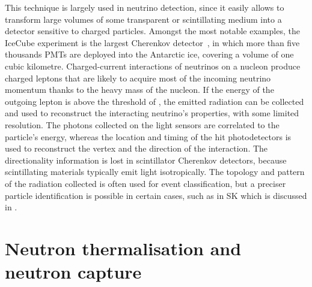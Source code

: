 This technique is largely used in neutrino detection, since it easily allows %
to transform large volumes of some transparent or scintillating medium into a detector sensitive to charged particles.
Amongst the most notable examples, the IceCube experiment is the largest Cherenkov detector~\cite{Abbasi:2008aa}, %
in which more than five thousands PMTs are deployed into the Antarctic ice, covering a volume of one cubic kilometre.
Charged-current interactions of neutrinos on a nucleon produce charged leptons %
that are likely to acquire most of the incoming neutrino momentum thanks to the heavy mass of the nucleon.
If the energy of the outgoing lepton is above the threshold of , %
the emitted radiation can be collected and used to reconstruct the interacting neutrino's properties, with some limited resolution.
The photons collected on the light sensors are correlated to the particle's energy, %
whereas the location and timing of the hit photodetectors is used to reconstruct the vertex %
and the direction of the interaction.
The directionality information is lost in scintillator Cherenkov detectors, because %
scintillating materials typically emit light isotropically.
The topology and pattern of the radiation collected is often used for event classification, %
but a preciser particle identification is possible in certain cases, such as in SK which is discussed in .




\section{Neutron thermalisation and neutron capture}
\label{sec:neutron}


